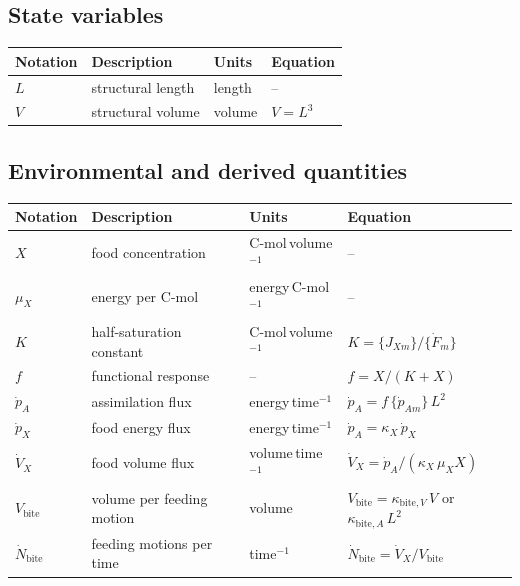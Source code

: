 \documentclass[11pt]{article}
\begin{document}
\subsection*{State variables}

\begin{center}
\begin{tabular}{l|l|l|l}
  \hline
  Notation & Description & Units & Equation \\
  \hline\hline
  $L$ & structural length & length & -- \\
  $V$ & structural volume & volume & $V = L^3$ \\
  \hline
\end{tabular}
\end{center}

\subsection*{Environmental and derived quantities}

\begin{center}
\begin{tabular}{l|l|l|l}
  \hline
  Notation & Description & Units & Equation \\
  \hline\hline
  $X$ & food concentration & C-mol\,volume$^{-1}$ & -- \\
  $\mu_X$ & energy per C-mol & energy\,C-mol$^{-1}$ & -- \\
  $K$ & half-saturation constant & C-mol\,volume$^{-1}$ & $K = \{J_{Xm}\}/\{\dot{F}_m\}$ \\
  $f$ & functional response & -- & $f = X/(K+X)$ \\
  $\dot{p}_A$ & assimilation flux & energy\,time$^{-1}$ & $\dot{p}_A = f\,\{\dot{p}_{Am}\}\,L^2$ \\
  $\dot{p}_X$ & food energy flux & energy\,time$^{-1}$ & $\dot{p}_A = \kappa_X\,\dot{p}_X$ \\
  $\dot{V}_X$ & food volume flux & volume\,time$^{-1}$ & $\dot{V}_X = \dot{p}_A/(\kappa_X\,\mu_X X)$ \\
  $V_{\text{bite}}$ & volume per feeding motion & volume & $V_{\text{bite}} = \kappa_{\text{bite},V}\,V$ or $\kappa_{\text{bite},A}\,L^2$ \\
  $\dot N_{\text{bite}}$ & feeding motions per time & time$^{-1}$ & $\dot N_{\text{bite}} = \dot{V}_X/V_{\text{bite}}$ \\
  \hline
\end{tabular}
\end{center}
\end{document}
